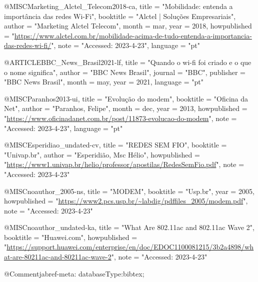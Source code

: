 @MISC{Marketing_Alctel_Telecom2018-ca,
	title        = "Mobilidade: entenda a import{\^a}ncia das redes {Wi-Fi}",
	booktitle    = "Alctel | Solu{\c c}{\~o}es Empresariais",
	author       = "{Marketing Alctel Telecom}",
	month        =  mar,
	year         =  2018,
	howpublished = "\url{https://www.alctel.com.br/mobilidade-acima-de-tudo-entenda-a-importancia-das-redes-wi-fi/}",
	note         = "Accessed: 2023-4-23",
	language     = "pt"
}

@ARTICLE{BBC_News_Brasil2021-lf,
	title     = "Quando o wi-fi foi criado e o que o nome significa",
	author    = "{BBC News Brasil}",
	journal   = "BBC",
	publisher = "BBC News Brasil",
	month     =  may,
	year      =  2021,
	language  = "pt"
}

@MISC{Paranhos2013-ui,
	title        = "Evolu{\c c}{\~a}o do modem",
	booktitle    = "Oficina da Net",
	author       = "Paranhos, Felipe",
	month        =  dec,
	year         =  2013,
	howpublished = "\url{https://www.oficinadanet.com.br/post/11873-evolucao-do-modem}",
	note         = "Accessed: 2023-4-23",
	language     = "pt"
}

@MISC{Esperidiao_undated-cv,
	title        = "{REDES} {SEM} {FIO}",
	booktitle    = "Univap.br",
	author       = "Esperidi{\~a}o, Msc H{\'e}lio",
	howpublished = "\url{https://www1.univap.br/helio/professor/apostilas/RedesSemFio.pdf}",
	note         = "Accessed: 2023-4-23"
}

@MISC{noauthor_2005-ns,
	title        = "{MODEM}",
	booktitle    = "Usp.br",
	year         =  2005,
	howpublished = "\url{https://www2.pcs.usp.br/~labdig/pdffiles_2005/modem.pdf}",
	note         = "Accessed: 2023-4-23"
}

@MISC{noauthor_undated-ka,
	title        = "What Are 802.11ac and 802.11ac Wave 2",
	booktitle    = "Huawei.com",
	howpublished = "\url{https://support.huawei.com/enterprise/en/doc/EDOC1100081215/3b2a4898/what-are-80211ac-and-80211ac-wave-2}",
	note         = "Accessed: 2023-4-23"
}


@Comment{jabref-meta: databaseType:bibtex;}
